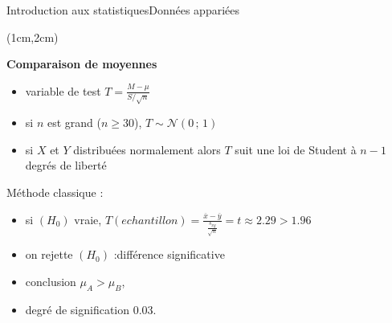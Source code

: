 \documentclass{beamer}
\begin{document}

\begin{frame}{Introduction aux statistiques}{Données appariées}
\begin{textblock*}{\textwidth}(1cm,2cm)

\begin{center}{\bf \Large Comparaison de moyennes } \end{center}




 \begin{itemize}
 \item variable de test  $T=\frac{M-\mu}{S/\sqrt{n}}$
 \item si $n$ est grand ($n\geq 30$), $T\sim \mathcal{N}(0\,;\,1)$
 \item si $X$ et $Y$  distribuées normalement alors $T$ suit une loi de Student à $n-1$ degrés de liberté
 \end{itemize}

Méthode classique :

\begin{itemize}
\item si $(H_0)$ vraie, $T(echantillon) = \frac{\overline{x}-\overline{y}}{\frac{s_{xy}}{\sqrt{n}}}=t\approx 2.29>1.96$ 
\item on  rejette $(H_0)$ :différence significative
\item conclusion $\mu_A > \mu_B$,
\item  degré de signification  0.03.
\end{itemize}

\end{textblock*}

\end{frame}

 
\end{document}
